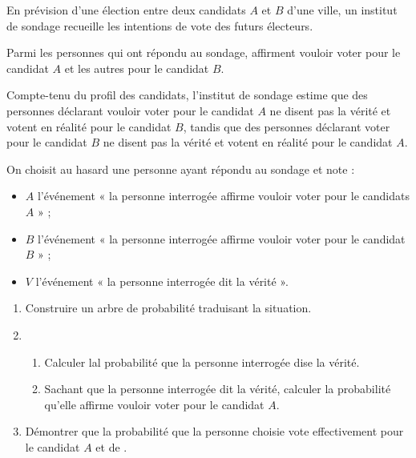 \documentclass[a4paper,12pt,french]{article}
\begin{document}
\begin{Exercise}[number=2]
  En prévision d'une élection entre deux candidats $A$ et $B$ d'une
  ville, un institut de sondage recueille les intentions de vote des
  futurs électeurs.

  Parmi les  personnes qui ont répondu au sondage, 
  affirment vouloir voter pour le candidat $A$ et les autres pour le
  candidat $B$.

  Compte-tenu du profil des candidats, l'institut de sondage estime
  que  des personnes déclarant vouloir voter pour le
  candidat $A$ ne disent pas la vérité et votent en réalité pour le
  candidat $B$, tandis que  des personnes déclarant voter
  pour le candidat $B$ ne disent pas la vérité et votent en réalité
  pour le candidat $A$.

  On choisit au hasard une personne ayant répondu au sondage et note :
  \begin{itemize}%
    \item $A$ l'événement « la personne interrogée affirme vouloir
      voter pour le candidats $A$ » ;
    \item $B$ l'événement « la personne interrogée affirme vouloir
      voter pour le candidat $B$ » ;
    \item $V$ l'événement « la personne interrogée dit la vérité ».
  \end{itemize}

  \begin{enumerate}
    \item Construire un arbre de probabilité traduisant la situation.
    \item \begin{enumerate}
        \item Calculer lal probabilité que la personne interrogée dise
          la vérité.
        \item Sachant que la personne interrogée dit la vérité,
          calculer la probabilité qu'elle affirme vouloir voter pour
          le candidat $A$.
      \end{enumerate}
    \item Démontrer que la probabilité que la personne choisie vote
      effectivement pour le candidat $A$ et de .

  \end{enumerate}

\end{Exercise}
\end{document}
